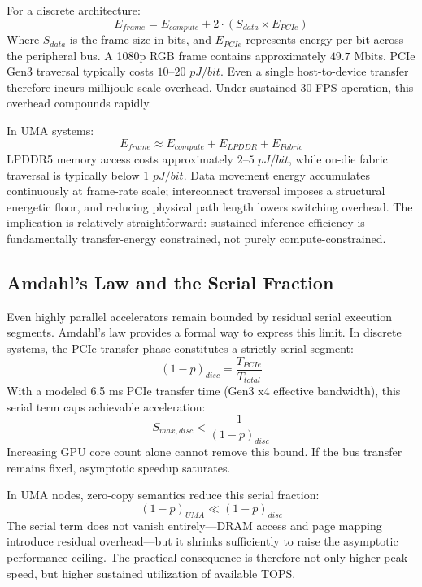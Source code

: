 \documentclass[conference]{IEEEtran}
\begin{document}
For a discrete architecture:
\begin{equation}
E_{frame} = E_{compute} + 2 \cdot (S_{data} \times E_{PCIe})
\end{equation}
Where $S_{data}$ is the frame size in bits, and $E_{PCIe}$ represents energy per bit across the peripheral bus. A 1080p RGB frame contains approximately $49.7$ Mbits. PCIe Gen3 traversal typically costs $10$–$20$ $pJ/bit$. Even a single host-to-device transfer therefore incurs millijoule-scale overhead. Under sustained 30 FPS operation, this overhead compounds rapidly.

In UMA systems:
\begin{equation}
E_{frame} \approx E_{compute} + E_{LPDDR} + E_{Fabric}
\end{equation}
LPDDR5 memory access costs approximately $2$–$5$ $pJ/bit$, while on-die fabric traversal is typically below $1$ $pJ/bit$. Data movement energy accumulates continuously at frame-rate scale; interconnect traversal imposes a structural energetic floor, and reducing physical path length lowers switching overhead. The implication is relatively straightforward: sustained inference efficiency is fundamentally transfer-energy constrained, not purely compute-constrained.

\subsection{Amdahl's Law and the Serial Fraction}
Even highly parallel accelerators remain bounded by residual serial execution segments. Amdahl’s law provides a formal way to express this limit. In discrete systems, the PCIe transfer phase constitutes a strictly serial segment:
\begin{equation}
(1-p)_{disc} = \frac{T_{PCIe}}{T_{total}}
\end{equation}
With a modeled 6.5 ms PCIe transfer time (Gen3 x4 effective bandwidth), this serial term caps achievable acceleration:
\begin{equation}
S_{max,disc} < \frac{1}{(1-p)_{disc}}
\end{equation}
Increasing GPU core count alone cannot remove this bound. If the bus transfer remains fixed, asymptotic speedup saturates.

In UMA nodes, zero-copy semantics reduce this serial fraction:
\begin{equation}
(1-p)_{UMA} \ll (1-p)_{disc}
\end{equation}
The serial term does not vanish entirely—DRAM access and page mapping introduce residual overhead—but it shrinks sufficiently to raise the asymptotic performance ceiling. The practical consequence is therefore not only higher peak speed, but higher sustained utilization of available TOPS.
\end{document}
